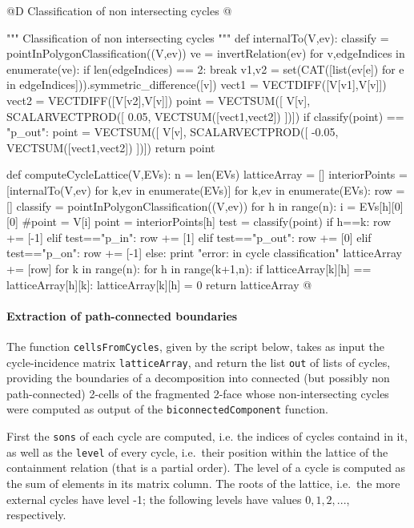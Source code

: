 \documentclass[11pt,oneside]{article}    %
\begin{document}
@D Classification of non intersecting cycles
@{""" Classification of non intersecting cycles """
def internalTo(V,ev):
    classify = pointInPolygonClassification((V,ev))
    ve = invertRelation(ev)
    for v,edgeIndices in enumerate(ve):
        if len(edgeIndices) == 2: break
    v1,v2 = set(CAT([list(ev[e]) for e in edgeIndices])).symmetric_difference([v])
    vect1 = VECTDIFF([V[v1],V[v]])
    vect2 = VECTDIFF([V[v2],V[v]])
    point = VECTSUM([ V[v], SCALARVECTPROD([ 0.05, VECTSUM([vect1,vect2]) ])])
    if classify(point) == "p_out":
        point = VECTSUM([ V[v], SCALARVECTPROD([ -0.05, VECTSUM([vect1,vect2]) ])])
    return point
    
def computeCycleLattice(V,EVs):
    n = len(EVs)
    latticeArray = []
    interiorPoints = [internalTo(V,ev) for k,ev in enumerate(EVs)]
    for k,ev in enumerate(EVs):
        row = []
        classify = pointInPolygonClassification((V,ev))
        for h in range(n):
            i = EVs[h][0][0]
            #point = V[i]
            point = interiorPoints[h]
            test = classify(point)
            if h==k: row += [-1]
            elif test=="p_in": row += [1]
            elif test=="p_out": row += [0]
            elif test=="p_on": row += [-1]
            else: print "error: in cycle classification"
        latticeArray += [row]
    for k in range(n):
        for h in range(k+1,n): 
            if latticeArray[k][h] == latticeArray[h][k]:
                latticeArray[k][h] = 0
    return latticeArray
@}

\paragraph{Extraction of path-connected boundaries}

The function \texttt{cellsFromCycles}, given by the script below, takes as input the cycle-incidence matrix \texttt{latticeArray}, and return the list \texttt{out} of lists of cycles, providing the boundaries of a decomposition into connected (but possibly non path-connected) 2-cells of the fragmented 2-face whose non-intersecting cycles were computed as output of the \texttt{biconnectedComponent} function. 

First the \texttt{sons} of each cycle are computed, i.e. the indices of cycles containd in it, as well as the \texttt{level} of every cycle, i.e.~their position within the lattice of the containment relation (that is a partial order). 
The level of a cycle is computed as the sum of elements in its matrix column. The roots of the lattice, i.e.~the more external cycles have level -1; the following levels have values $0,1,2,...$, respectively.
\end{document}
